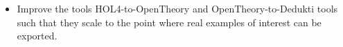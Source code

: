 





\begin{itemize}
  \item Improve the tools HOL4-to-OpenTheory and OpenTheory-to-Dedukti
  tools such that they scale to the point where real examples of
  interest can be exported.
\end{itemize}

